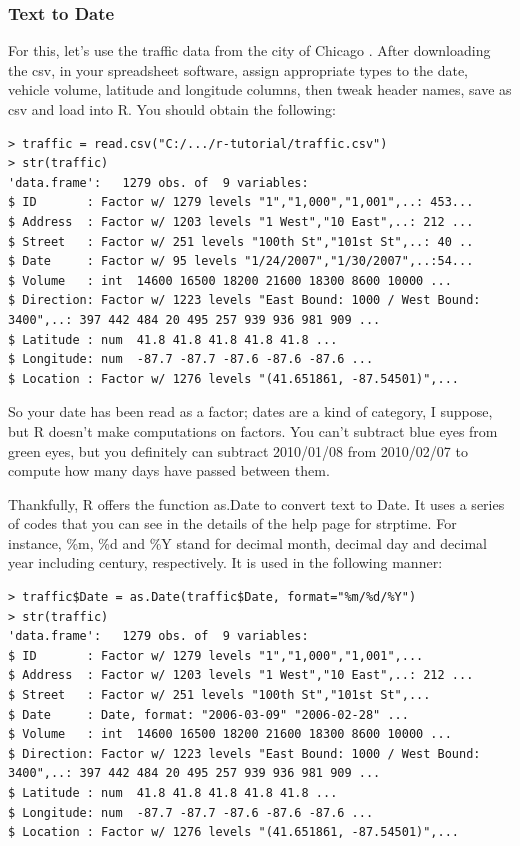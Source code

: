 \documentclass{report}
\newcommand{\code}[1]{\textsf{\ttfamily #1}}
\begin{document}
			\subsubsection{Text to \code{Date}}
			For this, let's use the traffic data from the city of Chicago \cite{traffic}. After downloading the csv, in your spreadsheet software, assign appropriate types to the date, vehicle volume, latitude and longitude columns, then tweak header names, save as csv and load into R. You should obtain the following:
			\begin{verbatim}
> traffic = read.csv("C:/.../r-tutorial/traffic.csv")
> str(traffic)
'data.frame':   1279 obs. of  9 variables:
$ ID       : Factor w/ 1279 levels "1","1,000","1,001",..: 453...
$ Address  : Factor w/ 1203 levels "1 West","10 East",..: 212 ...
$ Street   : Factor w/ 251 levels "100th St","101st St",..: 40 ..
$ Date     : Factor w/ 95 levels "1/24/2007","1/30/2007",..:54...
$ Volume   : int  14600 16500 18200 21600 18300 8600 10000 ...
$ Direction: Factor w/ 1223 levels "East Bound: 1000 / West Bound: 3400",..: 397 442 484 20 495 257 939 936 981 909 ...
$ Latitude : num  41.8 41.8 41.8 41.8 41.8 ...
$ Longitude: num  -87.7 -87.7 -87.6 -87.6 -87.6 ...
$ Location : Factor w/ 1276 levels "(41.651861, -87.54501)",...
			\end{verbatim}
			
			So your date has been read as a factor; dates are a kind of category, I suppose, but R doesn't make computations on factors. You can't subtract blue eyes from green eyes, but you definitely can subtract 2010/01/08 from 2010/02/07 to compute how many days have passed between them.
			
			Thankfully, R offers the function \code{as.Date} to convert text to \code{Date}. It uses a series of codes that you can see in the details of the help page for \code{strptime}. For instance, \code{\%m}, \code{\%d} and \code{\%Y} stand for decimal month, decimal day and decimal year including century, respectively. It is used in the following manner:
			\begin{verbatim}
> traffic$Date = as.Date(traffic$Date, format="%m/%d/%Y")
> str(traffic)
'data.frame':   1279 obs. of  9 variables:
$ ID       : Factor w/ 1279 levels "1","1,000","1,001",...
$ Address  : Factor w/ 1203 levels "1 West","10 East",..: 212 ...
$ Street   : Factor w/ 251 levels "100th St","101st St",...
$ Date     : Date, format: "2006-03-09" "2006-02-28" ...
$ Volume   : int  14600 16500 18200 21600 18300 8600 10000 ...
$ Direction: Factor w/ 1223 levels "East Bound: 1000 / West Bound: 3400",..: 397 442 484 20 495 257 939 936 981 909 ...
$ Latitude : num  41.8 41.8 41.8 41.8 41.8 ...
$ Longitude: num  -87.7 -87.7 -87.6 -87.6 -87.6 ...
$ Location : Factor w/ 1276 levels "(41.651861, -87.54501)",...
			\end{verbatim}
			
\end{document}
